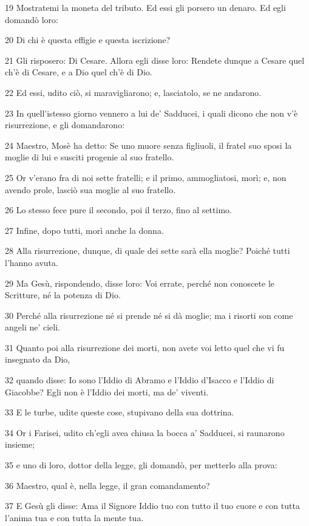 \par 19 Mostratemi la moneta del tributo. Ed essi gli porsero un denaro. Ed egli domandò loro:
\par 20 Di chi è questa effigie e questa iscrizione?
\par 21 Gli risposero: Di Cesare. Allora egli disse loro: Rendete dunque a Cesare quel ch'è di Cesare, e a Dio quel ch'è di Dio.
\par 22 Ed essi, udito ciò, si maravigliarono; e, lasciatolo, se ne andarono.
\par 23 In quell'istesso giorno vennero a lui de' Sadducei, i quali dicono che non v'è risurrezione, e gli domandarono:
\par 24 Maestro, Mosè ha detto: Se uno muore senza figliuoli, il fratel suo sposi la moglie di lui e susciti progenie al suo fratello.
\par 25 Or v'erano fra di noi sette fratelli; e il primo, ammogliatosi, morì; e, non avendo prole, lasciò sua moglie al suo fratello.
\par 26 Lo stesso fece pure il secondo, poi il terzo, fino al settimo.
\par 27 Infine, dopo tutti, morì anche la donna.
\par 28 Alla risurrezione, dunque, di quale dei sette sarà ella moglie? Poiché tutti l'hanno avuta.
\par 29 Ma Gesù, rispondendo, disse loro: Voi errate, perché non conoscete le Scritture, né la potenza di Dio.
\par 30 Perché alla risurrezione né si prende né si dà moglie; ma i risorti son come angeli ne' cieli.
\par 31 Quanto poi alla risurrezione dei morti, non avete voi letto quel che vi fu insegnato da Dio,
\par 32 quando disse: Io sono l'Iddio di Abramo e l'Iddio d'Isacco e l'Iddio di Giacobbe? Egli non è l'Iddio dei morti, ma de' viventi.
\par 33 E le turbe, udite queste cose, stupivano della sua dottrina.
\par 34 Or i Farisei, udito ch'egli avea chiusa la bocca a' Sadducei, si raunarono insieme;
\par 35 e uno di loro, dottor della legge, gli domandò, per metterlo alla prova:
\par 36 Maestro, qual è, nella legge, il gran comandamento?
\par 37 E Gesù gli disse: Ama il Signore Iddio tuo con tutto il tuo cuore e con tutta l'anima tua e con tutta la mente tua.
